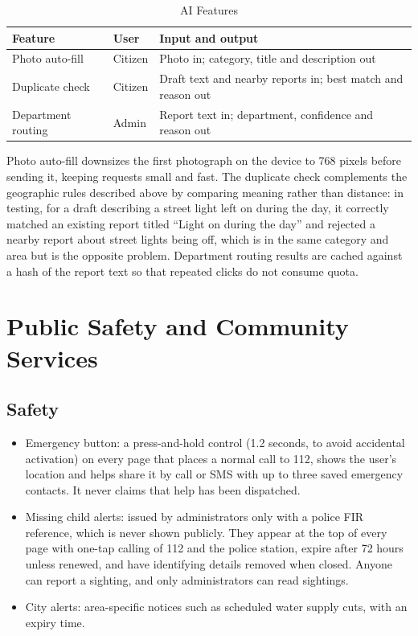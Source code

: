 \documentclass[conference]{IEEEtran}
\begin{document}
\begin{table}[htbp]
\caption{AI Features}
\label{tab:3}
\begin{center}
\footnotesize
\begin{tabular}{|>{\raggedright\arraybackslash}p{}|>{\raggedright\arraybackslash}p{}|>{\raggedright\arraybackslash}p{}|}
\hline
\textbf{Feature} & \textbf{User} & \textbf{Input and output} \\
\hline
Photo auto-fill & Citizen & Photo in; category, title and description out \\ \hline
Duplicate check & Citizen & Draft text and nearby reports in; best match and reason out \\ \hline
Department routing & Admin & Report text in; department, confidence and reason out \\ \hline
\end{tabular}
\end{center}
\end{table}
Photo auto-fill downsizes the first photograph on the device to 768 pixels before sending it, keeping requests small and fast. The duplicate check complements the geographic rules described above by comparing meaning rather than distance: in testing, for a draft describing a street light left on during the day, it correctly matched an existing report titled ``Light on during the day'' and rejected a nearby report about street lights being off, which is in the same category and area but is the opposite problem. Department routing results are cached against a hash of the report text so that repeated clicks do not consume quota.

\section{Public Safety and Community Services}
\subsection{Safety}
\begin{itemize}
\item Emergency button: a press-and-hold control (1.2 seconds, to avoid accidental activation) on every page that places a normal call to 112, shows the user's location and helps share it by call or SMS with up to three saved emergency contacts. It never claims that help has been dispatched.
\item Missing child alerts: issued by administrators only with a police FIR reference, which is never shown publicly. They appear at the top of every page with one-tap calling of 112 and the police station, expire after 72 hours unless renewed, and have identifying details removed when closed. Anyone can report a sighting, and only administrators can read sightings.
\item City alerts: area-specific notices such as scheduled water supply cuts, with an expiry time.
\end{itemize}
\end{document}
